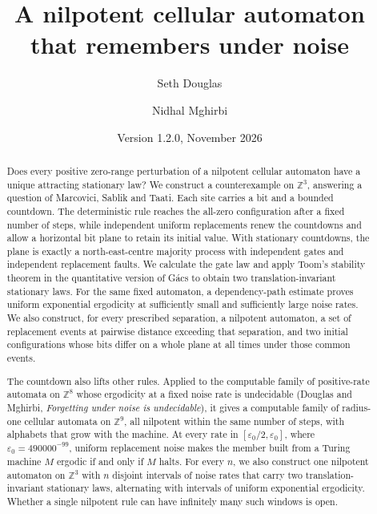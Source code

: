\documentclass[11pt]{article}
\title{\vspace{-1.2cm}\LARGE A nilpotent cellular automaton\\ that remembers under noise}
\author{Seth Douglas \and Nidhal Mghirbi}
\date{\small Version 1.2.0, November 2026}
\theoremstyle{plain}
\theoremstyle{definition}
\theoremstyle{remark}
\newcommand{\Z}{\mathbb Z}
\newcommand{\eps}{\varepsilon}
\begin{document}
\maketitle
\begin{abstract}
\noindent
Does every positive zero-range perturbation of a nilpotent cellular automaton have a unique attracting stationary law? We construct a counterexample on $\Z^3$, answering a question of Marcovici, Sablik and Taati. Each site carries a bit and a bounded countdown. The deterministic rule reaches the all-zero configuration after a fixed number of steps, while independent uniform replacements renew the countdowns and allow a horizontal bit plane to retain its initial value. With stationary countdowns, the plane is exactly a north-east-centre majority process with independent gates and independent replacement faults. We calculate the gate law and apply Toom's stability theorem in the quantitative version of G\'acs to obtain two translation-invariant stationary laws. For the same fixed automaton, a dependency-path estimate proves uniform exponential ergodicity at sufficiently small and sufficiently large noise rates. We also construct, for every prescribed separation, a nilpotent automaton, a set of replacement events at pairwise distance exceeding that separation, and two initial configurations whose bits differ on a whole plane at all times under those common events.

The countdown also lifts other rules. Applied to the computable family of positive-rate automata on $\Z^8$ whose ergodicity at a fixed noise rate is undecidable (Douglas and Mghirbi, \emph{Forgetting under noise is undecidable}), it gives a computable family of radius-one cellular automata on $\Z^9$, all nilpotent within the same number of steps, with alphabets that grow with the machine. At every rate in $[\eps_0/2,\eps_0]$, where $\eps_0=490000^{-99}$, uniform replacement noise makes the member built from a Turing machine $M$ ergodic if and only if $M$ halts. For every $n$, we also construct one nilpotent automaton on $\Z^3$ with $n$ disjoint intervals of noise rates that carry two translation-invariant stationary laws, alternating with intervals of uniform exponential ergodicity. Whether a single nilpotent rule can have infinitely many such windows is open.


\end{abstract}
\end{document}
